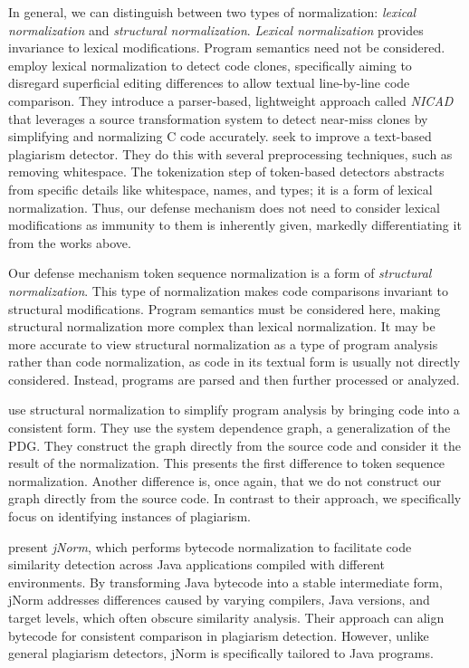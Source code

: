 In general, we can distinguish between two types of normalization: \emph{lexical normalization} and \emph{structural normalization}.
%
\emph{Lexical normalization} provides invariance to lexical modifications. Program semantics need not be considered. \citet{roy2008} employ lexical normalization to detect code clones, specifically aiming to disregard superficial editing differences to allow textual line-by-line code comparison. They introduce a parser-based, lightweight approach called \textit{NICAD} that leverages a source transformation system to detect near-miss clones by simplifying and normalizing C code accurately. %
\citet{allyson2019} seek to improve a text-based plagiarism detector. They do this with several preprocessing techniques, such as removing whitespace.
The tokenization step of token-based detectors abstracts from specific details like whitespace, names, and types; it is a form of lexical normalization. Thus, our defense mechanism does not need to consider lexical modifications as immunity to them is inherently given, markedly differentiating it from the works above.

Our defense mechanism token sequence normalization is a form of \emph{structural normalization}. This type of normalization makes code comparisons invariant to structural modifications. Program semantics must be considered here, making structural normalization more complex than lexical normalization. It may be more accurate to view structural normalization as a type of program analysis rather than code normalization, as code in its textual form is usually not directly considered. Instead, programs are parsed and then further processed or analyzed.

\citet{wang2008} use structural normalization to simplify program analysis by bringing code into a consistent form. They use the system dependence graph, a generalization of the PDG. 
%
They construct the graph directly from the source code and consider it the result of the normalization.
This presents the first difference to token sequence normalization. Another difference is, once again, that we do not construct our graph directly from the source code. In contrast to their approach, we specifically focus on identifying instances of plagiarism.

\citet{Schott2024} present \textit{jNorm}, which performs bytecode normalization to facilitate code similarity detection across Java applications compiled with different environments. By transforming Java bytecode into a stable intermediate form, jNorm addresses differences caused by varying compilers, Java versions, and target levels, which often obscure similarity analysis.
%
Their approach can align bytecode for consistent comparison in plagiarism detection. However, unlike general plagiarism detectors, jNorm is specifically tailored to Java programs.

